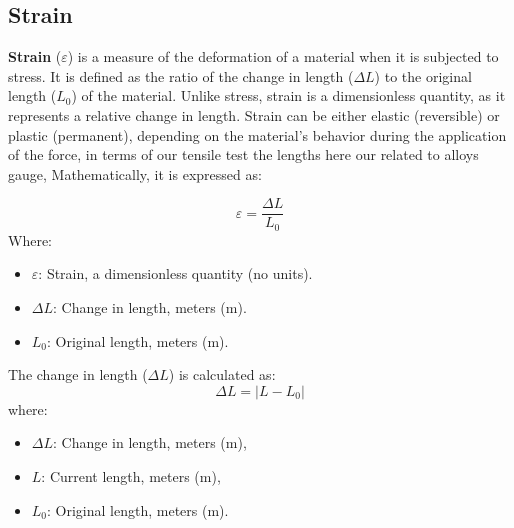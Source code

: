 \documentclass{article}
\begin{document}
        \subsection{Strain}
        \textbf{Strain} ($\varepsilon$) is a measure of the deformation of a material when it is subjected to stress. It is defined as the ratio of the change in length ($\Delta L$) to the original length ($L_0$) of the material. Unlike stress, strain is a dimensionless quantity, as it represents a relative change in length. Strain can be either elastic (reversible) or plastic (permanent), depending on the material's behavior during the application of the force, in terms of our tensile test the lengths here our related to alloys gauge, Mathematically, it is expressed as:\\[8pt]        
        \begin{minipage}{0.48\textwidth}
            \begin{equation}
                \varepsilon = \frac{\Delta L}{L_0}
            \end{equation}
            Where:
            \begin{itemize}[left=0pt,itemsep=-1mm]
                \item \( \varepsilon \): Strain, a dimensionless quantity (no units).
                \item \( \Delta L \): Change in length, meters (m).
                \item \( L_0 \): Original length, meters (m).
            \end{itemize}
        \end{minipage}\hfill
        \begin{minipage}{0.48\textwidth}
            The change in length (\( \Delta L \)) is calculated as:
            \begin{equation}
                \Delta L = \left| L - L_0 \right|
            \end{equation}
            where:
            \begin{itemize}[left=0pt,itemsep=-1mm]
                \item \( \Delta L \): Change in length, meters (m),
                \item \( L \): Current length, meters (m),
                \item \( L_0 \): Original length, meters (m).
            \end{itemize}
        \end{minipage}
        
\end{document}
